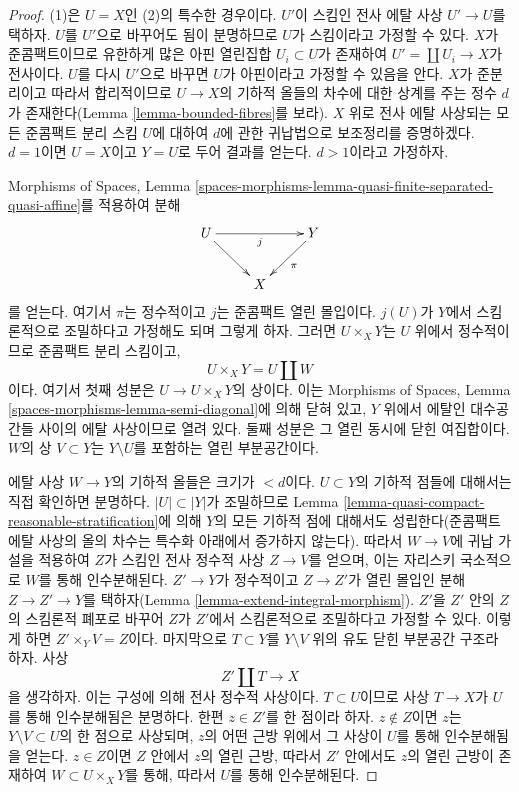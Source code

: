 \begin{proof}
(1)은 $U = X$인 (2)의 특수한 경우이다.
$U'$이 스킴인 전사 에탈 사상 $U' \to U$를 택하자.
$U$를 $U'$으로 바꾸어도 됨이 분명하므로 $U$가 스킴이라고 가정할
수 있다. $X$가 준콤팩트이므로 유한하게 많은 아핀 열린집합
$U_i \subset U$가 존재하여 $U' = \coprod U_i \to X$가 전사이다.
$U$를 다시 $U'$으로 바꾸면 $U$가 아핀이라고 가정할 수 있음을 안다.
$X$가 준분리이고 따라서 합리적이므로 $U \to X$의 기하적 올들의
차수에 대한 상계를 주는 정수 $d$가 존재한다(Lemma
\ref{lemma-bounded-fibres}를 보라).
$X$ 위로 전사 에탈 사상되는 모든 준콤팩트 분리 스킴 $U$에 대하여
$d$에 관한 귀납법으로 보조정리를 증명하겠다.
$d = 1$이면 $U = X$이고 $Y = U$로 두어 결과를 얻는다.
$d > 1$이라고 가정하자.

\medskip\noindent
Morphisms of Spaces, Lemma
\ref{spaces-morphisms-lemma-quasi-finite-separated-quasi-affine}를 적용하여
분해
$$
\xymatrix{
U \ar[rr]_j \ar[rd] & & Y \ar[ld]^\pi \\
& X
}
$$
를 얻는다. 여기서 $\pi$는 정수적이고 $j$는 준콤팩트 열린 몰입이다.
$j(U)$가 $Y$에서 스킴론적으로 조밀하다고 가정해도 되며 그렇게 하자.
그러면 $U \times_X Y$는 $U$ 위에서 정수적이므로 준콤팩트 분리
스킴이고,
$$
U \times_X Y = U \amalg W
$$
이다. 여기서 첫째 성분은 $U \to U \times_X Y$의 상이다.
이는 Morphisms of Spaces, Lemma
\ref{spaces-morphisms-lemma-semi-diagonal}에 의해 닫혀 있고,
$Y$ 위에서 에탈인 대수공간들 사이의 에탈 사상이므로 열려 있다.
둘째 성분은 그 열린 동시에 닫힌 여집합이다.
$W$의 상 $V \subset Y$는 $Y \setminus U$를 포함하는 열린
부분공간이다.

\medskip\noindent
에탈 사상 $W \to Y$의 기하적 올들은 크기가 $< d$이다.
$U \subset Y$의 기하적 점들에 대해서는 직접 확인하면 분명하다.
$|U| \subset |Y|$가 조밀하므로 Lemma
\ref{lemma-quasi-compact-reasonable-stratification}에 의해
$Y$의 모든 기하적 점에 대해서도 성립한다(준콤팩트 에탈 사상의
올의 차수는 특수화 아래에서 증가하지 않는다).
따라서 $W \to V$에 귀납 가설을 적용하여 $Z$가 스킴인 전사 정수적
사상 $Z \to V$를 얻으며, 이는 자리스키 국소적으로 $W$를 통해
인수분해된다. $Z' \to Y$가 정수적이고 $Z \to Z'$가 열린 몰입인
분해 $Z \to Z' \to Y$를 택하자(Lemma
\ref{lemma-extend-integral-morphism}).
$Z'$을 $Z'$ 안의 $Z$의 스킴론적 폐포로 바꾸어 $Z$가 $Z'$에서
스킴론적으로 조밀하다고 가정할 수 있다. 이렇게 하면
$Z' \times_Y V = Z$이다. 마지막으로 $T \subset Y$를
$Y \setminus V$ 위의 유도 닫힌 부분공간 구조라 하자. 사상
$$
Z' \amalg T \longrightarrow X
$$
을 생각하자. 이는 구성에 의해 전사 정수적 사상이다.
$T \subset U$이므로 사상 $T \to X$가 $U$를 통해 인수분해됨은
분명하다. 한편 $z \in Z'$를 한 점이라 하자. $z \not \in Z$이면
$z$는 $Y \setminus V \subset U$의 한 점으로 사상되며, $z$의
어떤 근방 위에서 그 사상이 $U$를 통해 인수분해됨을 얻는다.
$z \in Z$이면 $Z$ 안에서 $z$의 열린 근방, 따라서 $Z'$ 안에서도
$z$의 열린 근방이 존재하여 $W \subset U \times_X Y$를 통해,
따라서 $U$를 통해 인수분해된다.
\end{proof}

